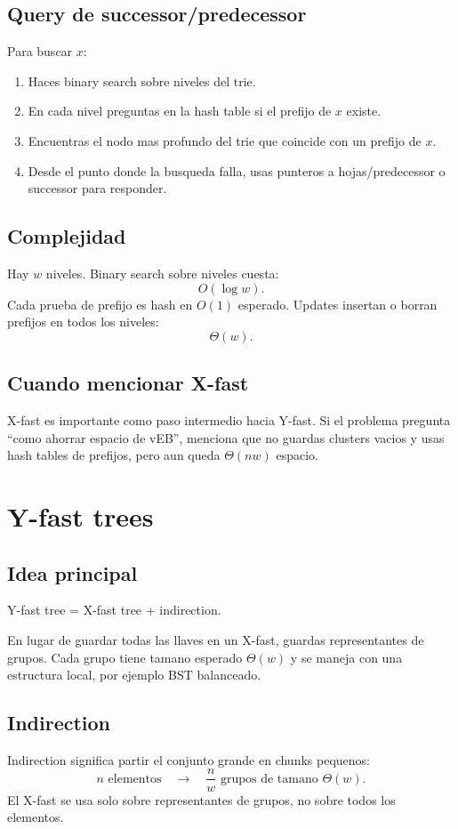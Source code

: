\documentclass[10pt]{article}
\newcommand{\bigO}{O}
\begin{document}
\subsection{Query de successor/predecessor}
Para buscar $x$:
\begin{enumerate}[leftmargin=*]
\item Haces binary search sobre niveles del trie.
\item En cada nivel preguntas en la hash table si el prefijo de $x$ existe.
\item Encuentras el nodo mas profundo del trie que coincide con un prefijo de
$x$.
\item Desde el punto donde la busqueda falla, usas punteros a hojas/predecessor
o successor para responder.
\end{enumerate}

\subsection{Complejidad}
Hay $w$ niveles. Binary search sobre niveles cuesta:
\[
\bigO(\log w).
\]
Cada prueba de prefijo es hash en $\bigO(1)$ esperado. Updates insertan o
borran prefijos en todos los niveles:
\[
\Theta(w).
\]

\subsection{Cuando mencionar X-fast}
X-fast es importante como paso intermedio hacia Y-fast. Si el problema pregunta
``como ahorrar espacio de vEB'', menciona que no guardas clusters vacios y usas
hash tables de prefijos, pero aun queda $\Theta(nw)$ espacio.

\newpage
\section{Y-fast trees}

\subsection{Idea principal}
Y-fast tree = X-fast tree + indirection.

En lugar de guardar todas las llaves en un X-fast, guardas representantes de
grupos. Cada grupo tiene tamano esperado $\Theta(w)$ y se maneja con una
estructura local, por ejemplo BST balanceado.

\subsection{Indirection}
Indirection significa partir el conjunto grande en chunks pequenos:
\[
n\text{ elementos}\quad \to\quad \frac n w\text{ grupos de tamano }\Theta(w).
\]
El X-fast se usa solo sobre representantes de grupos, no sobre todos los
elementos.
\end{document}
